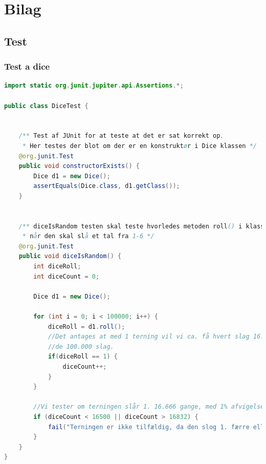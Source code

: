 \section{Bilag}
\subsection{Test}
\subsubsection{Test a dice}\label{diceTest}
\begin{lstlisting}[language=Java, caption=Dice is random test]
import static org.junit.jupiter.api.Assertions.*;

public class DiceTest {
    

    /** Test af JUnit for at teste at det er sat korrekt op.
     * Her testes der blot om der er en konstruktør i Dice klassen */
    @org.junit.Test
    public void constructorExists() {
        Dice d1 = new Dice();
        assertEquals(Dice.class, d1.getClass());
    }


    /** diceIsRandom testen skal teste hvorledes metoden roll() i klassen Dice er tilfældig,
     * når den skal slå et tal fra 1-6 */
    @org.junit.Test
    public void diceIsRandom() {
        int diceRoll;
        int diceCount = 0;

        Dice d1 = new Dice();

        for (int i = 0; i < 100000; i++) {
            diceRoll = d1.roll();
            //Det antages at med 1 terning vil vi ca. få hvert slag 16.666 gange ud af
            //de 100.000 slag.
            if(diceRoll == 1) {
                diceCount++;
            }
        }

        //Vi tester om terningen slår 1. 16.666 gange, med 1% afvigelse
        if (diceCount < 16500 || diceCount > 16832) {
            fail("Terningen er ikke tilfældig, da den slog 1. færre eller flere gange end forventet");
        }
    }
}
\end{lstlisting}

